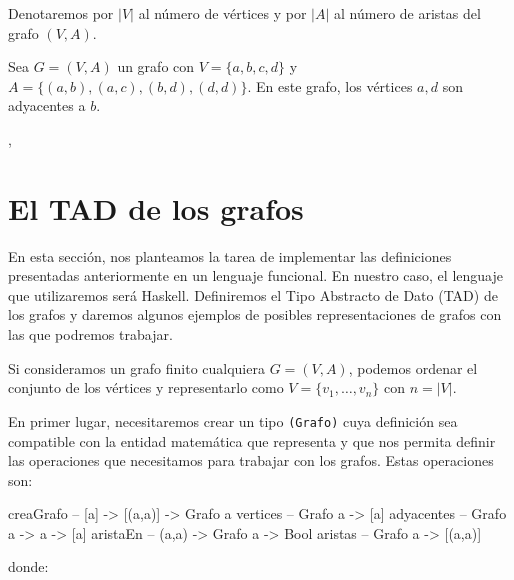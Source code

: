\begin{nota}
  Denotaremos por $|V|$ al número de vértices y por $|A|$ al número de aristas
  del grafo $(V,A)$.
\end{nota}

\begin{ejemplo}
  Sea $G = (V,A)$ un grafo con $V = \{a,b,c,d\}$ y
  $A = \{\allowbreak(a,b), \allowbreak (a,c), \allowbreak (b,d), 
  \allowbreak (d,d)\}$.
  En este grafo, los vértices $a,d$ son adyacentes a $b$.

  \begin{center},
  \end{center}
\end{ejemplo}

\section{El TAD de los grafos}

\label{sec:TAD_grafos}

En esta sección, nos planteamos la tarea de implementar las definiciones
presentadas anteriormente en un lenguaje funcional. En nuestro caso, el
lenguaje que utilizaremos será Haskell. Definiremos el Tipo Abstracto de Dato
(TAD) de los grafos y daremos algunos ejemplos de posibles representaciones de
grafos con las que podremos trabajar.

Si consideramos un grafo finito cualquiera $G = (V,A)$, podemos ordenar el
conjunto de los vértices y representarlo como $V = \{v_1, \dots, v_n\}$ con
$n = |V|$.

En primer lugar, necesitaremos crear un tipo \texttt{(Grafo)} cuya definición
sea compatible con la entidad matemática que representa y que nos permita 
definir las operaciones que necesitamos para trabajar con los grafos. 
Estas operaciones son:

\begin{code}
creaGrafo  -- [a] -> [(a,a)] -> Grafo a
vertices   -- Grafo a -> [a]
adyacentes -- Grafo a -> a -> [a]
aristaEn   -- (a,a) -> Grafo a -> Bool
aristas    -- Grafo a -> [(a,a)]
\end{code}
donde:

